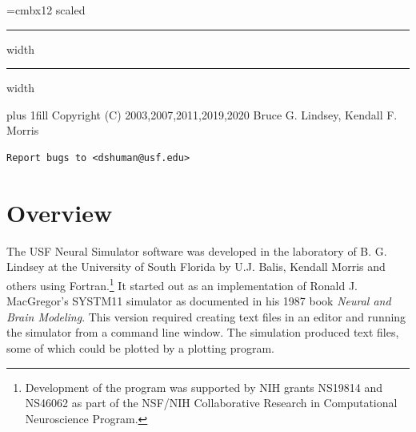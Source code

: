 \documentclass[12pt,openany,oneside]{book}
\newcommand{\ticite}[1]{\textit{#1}}
\begin{document}
{}

\begin{titlepage}
\begingroup
\parindent=0pt
\font\titlefont=cmbx12 scaled 
\leftline{\titlefont{}}
\vskip4pt \hrule height 4pt width \hsize \vskip4pt
\vskip4pt \hrule height 2pt width \hsize \vskip2pc
\par\vfill
\pagebreak
\begin{versionhistory}
\end{versionhistory}
\thispagestyle{empty}

\vglue 0pt plus 1fill
Copyright (C) 2003,2007,2011,2019,2020 Bruce G. Lindsey, Kendall F. Morris
\begin{verbatim}
Report bugs to <dshuman@usf.edu>
\end{verbatim}
\endgroup
\end{titlepage}

\lhead[]{\leftmark}
\rhead[]{}
\tableofcontents
\newpage

\lhead[]{\leftmark}
\rhead[\leftmark]{}
\fancyfoot[C]{\thepage}
\setlength{\headheight}{14.5pt}
\chapter{Overview}
The USF Neural Simulator software was developed in the laboratory of B. G.
Lindsey at the University of South Florida by U.J. Balis, Kendall Morris
and others using Fortran.\footnote{Development of the program was
supported by NIH grants NS19814 and NS46062 as part of the NSF/NIH
Collaborative Research in Computational Neuroscience Program.} It started
out as an implementation of Ronald J.  MacGregor's SYSTM11 simulator as
documented in his 1987 book \ticite{Neural and Brain Modeling}. This
version required creating text files in an editor and running the
simulator from a command line window.  The simulation produced text files,
some of which could be plotted by a plotting program. 
\end{document}
